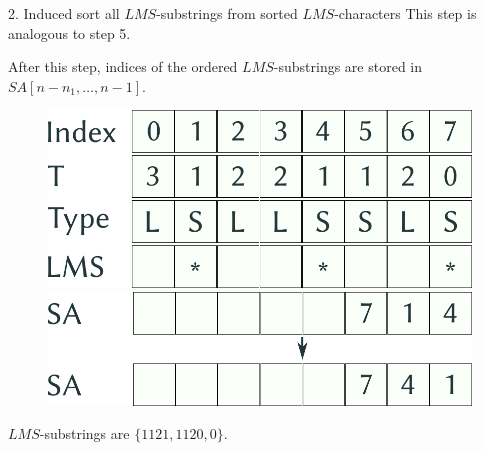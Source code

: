 \documentclass{beamer}
\begin{document}
  \begin{frame}{2. Induced sort all $LMS$-substrings from sorted $LMS$-characters}
    This step is analogous to step 5.

    After this step, indices of the ordered $LMS$-substrings are stored in $SA[n-n_1, \dots, n-1]$.

    \begin{figure}
    \centering
    \begin{minipage}{.5\textwidth}
      \centering
      \includegraphics[width=.9\linewidth]{img/preliminary.pdf}
    \end{minipage}%
    \begin{minipage}{.5\textwidth}
      \centering
      \includegraphics[width=.9\linewidth]{img/SA_2.pdf}
    \end{minipage}
    \end{figure}

    $LMS$-substrings are $\{ 1121, 1120, 0 \}$.
  \end{frame}
\end{document}
